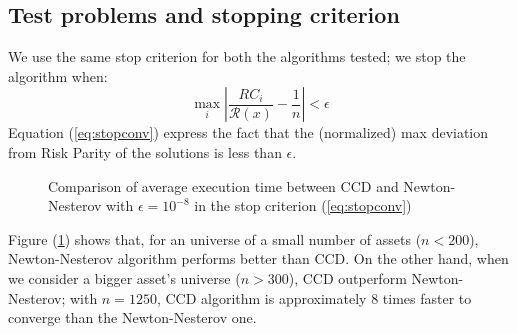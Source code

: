 \subsection{Test problems and stopping criterion}
We use the same stop criterion for both the algorithms tested; we stop the algorithm when:
\begin{equation}\label{eq:stopconv}
\max_i \left| \frac{RC_i}{\mathcal{R}(x)} - \frac{1}{n} \right| < \epsilon
\end{equation}
Equation (\ref{eq:stopconv}) express the fact that the (normalized) max deviation from Risk Parity of the solutions is less than $\epsilon$.
\begin{figure}
\centering
{}
\caption{Comparison of average execution time between CCD and Newton-Nesterov with $\epsilon = 10^{-8}$ in the stop criterion (\ref{eq:stopconv})}
\label{fig:convtest}
\end{figure}
Figure (\ref{fig:convtest})  shows that, for an universe of a small number of assets ($n<200$), Newton-Nesterov algorithm performs better than CCD. On the other hand, when we consider a bigger asset's universe ($n>300$), CCD outperform Newton-Nesterov; with $n=1250$, CCD algorithm is approximately 8 times faster to converge than the Newton-Nesterov one.
